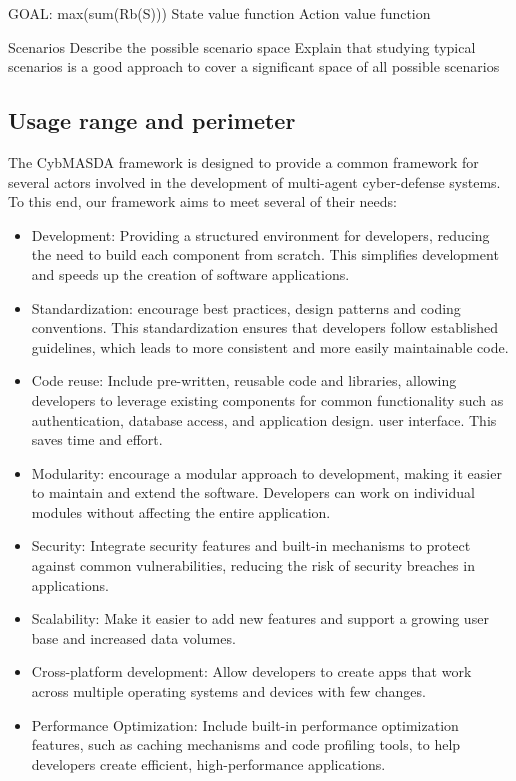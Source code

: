 \documentclass[conference]{IEEEtran}
\begin{document}
GOAL: max(sum(Rb(S)))
State value function
Action value function

Scenarios
Describe the possible scenario space
Explain that studying typical scenarios is a good approach to cover a significant space of all possible scenarios


\subsection{Usage range and perimeter}

The CybMASDA framework is designed to provide a common framework for several actors involved in the development of multi-agent cyber-defense systems. To this end, our framework aims to meet several of their needs:
\begin{itemize}
    \item Development: Providing a structured environment for developers, reducing the need to build each component from scratch. This simplifies development and speeds up the creation of software applications.
    \item Standardization: encourage best practices, design patterns and coding conventions. This standardization ensures that developers follow established guidelines, which leads to more consistent and more easily maintainable code.
    \item Code reuse: Include pre-written, reusable code and libraries, allowing developers to leverage existing components for common functionality such as authentication, database access, and application design. user interface. This saves time and effort.
    \item Modularity: encourage a modular approach to development, making it easier to maintain and extend the software. Developers can work on individual modules without affecting the entire application.
    \item Security: Integrate security features and built-in mechanisms to protect against common vulnerabilities, reducing the risk of security breaches in applications.
    \item Scalability: Make it easier to add new features and support a growing user base and increased data volumes.
    \item Cross-platform development: Allow developers to create apps that work across multiple operating systems and devices with few changes.
    \item Performance Optimization: Include built-in performance optimization features, such as caching mechanisms and code profiling tools, to help developers create efficient, high-performance applications.

\end{itemize}
\end{document}

